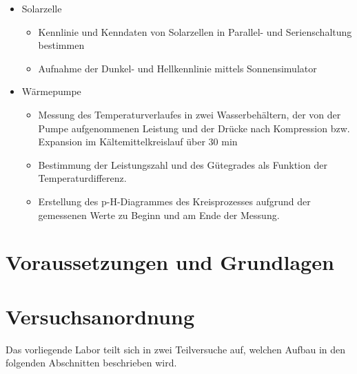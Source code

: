 \documentclass[english, ngerman]{scrartcl}
\begin{document}
\begin{itemize}
    \item Solarzelle
    \begin{itemize}
        \item Kennlinie und Kenndaten von Solarzellen in Parallel- und Serienschaltung bestimmen
        \item Aufnahme der Dunkel- und Hellkennlinie mittels Sonnensimulator
    \end{itemize}
    \item Wärmepumpe
    \begin{itemize}
        \item Messung des Temperaturverlaufes in zwei Wasserbehältern, der von der Pumpe aufgenommenen Leistung und der Drücke nach Kompression bzw. Expansion im Kältemittelkreislauf über
        30 min
        \item Bestimmung der Leistungszahl und des Gütegrades als Funktion der Temperaturdifferenz.
        \item Erstellung des p-H-Diagrammes des Kreisprozesses aufgrund der gemessenen Werte zu Beginn und am Ende der Messung.
    \end{itemize}
\end{itemize}



\section[Voraussetzungen und Grundlagen]{Voraussetzungen und Grundlagen \cite{ref:angabe_solar,ref:angabe_waerme}}

\section{Versuchsanordnung}
\label{sec:versuchsanordnung}
Das vorliegende Labor teilt sich in zwei Teilversuche auf, welchen Aufbau in den folgenden Abschnitten beschrieben wird.
\end{document}
